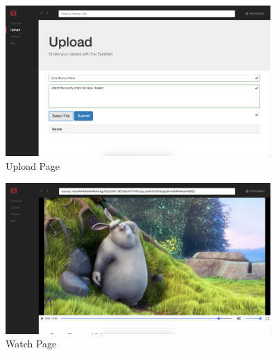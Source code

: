 \documentclass[final]{beamer}
\newlength{\sepwid}
\newlength{\onecolwid}
\newlength{\twocolwid}
\begin{document}
\begin{frame}[t]
\begin{columns}[t]
\begin{column}{\twocolwid}
\begin{columns}[t,totalwidth=\twocolwid] %


\end{columns} %

\end{column} %

\begin{column}{\sepwid}\end{column} %

\begin{column}{\onecolwid} %


\begin{block}{}

  \begin{figure}
  \includegraphics[width=0.8\linewidth]{upload-page.png}
  \caption{Upload Page}
  \label{fig:upload-page}
  \end{figure}

  \begin{figure}
  \includegraphics[width=0.8\linewidth]{watch-page.png}
  \caption{Watch Page}
  \label{fig:watch-page}
  \end{figure}


\end{block}
\end{column}
\end{columns}
\end{frame}
\end{document}
